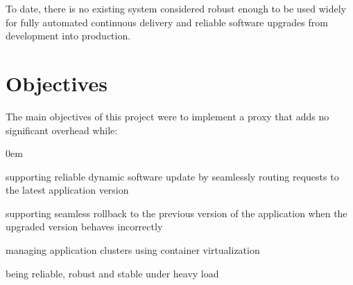 \documentclass[a4paper,11pt,twoside]{report}
\begin{document}
\setlength{\leftskip}{0pt}
\setlength{\rightskip}{0pt}
\noindent 
To date, there is no existing system considered robust enough to be used widely for fully automated continuous delivery and reliable software upgrades from development into production.
 
\section{Objectives}
The main objectives of this project were to implement a proxy that adds no significant overhead while:
\begin{list}{-}{}
\itemsep0em
\item supporting reliable dynamic software update by seamlessly routing requests to the latest application version
\item supporting seamless rollback to the previous version of the application when the upgraded version behaves incorrectly  
\item managing application clusters using container virtualization
\item being reliable, robust and stable under heavy load
\end{list}
 
\end{document}
